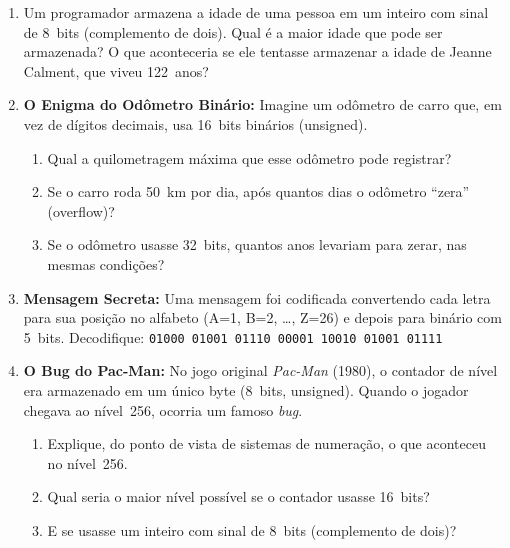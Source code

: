 \documentclass[11pt, a4paper]{article}
\begin{document}
\begin{enumerate}
\item Um programador armazena a idade de uma pessoa em um inteiro com sinal de 8~bits (complemento de dois). Qual \'{e} a maior idade que pode ser armazenada? O que aconteceria se ele tentasse armazenar a idade de Jeanne Calment, que viveu 122~anos?

\item \textbf{O Enigma do Od\^{o}metro Bin\'{a}rio:} Imagine um od\^{o}metro de carro que, em vez de d\'{i}gitos decimais, usa 16~bits bin\'{a}rios (unsigned).
\begin{enumerate}
  \item Qual a quilometragem m\'{a}xima que esse od\^{o}metro pode registrar?
  \item Se o carro roda 50~km por dia, ap\'{o}s quantos dias o od\^{o}metro ``zera'' (overflow)?
  \item Se o od\^{o}metro usasse 32~bits, quantos anos levariam para zerar, nas mesmas condi\c{c}\~{o}es?
\end{enumerate}

\item \textbf{Mensagem Secreta:} Uma mensagem foi codificada convertendo cada letra para sua posi\c{c}\~{a}o no alfabeto (A=1, B=2, \ldots, Z=26) e depois para bin\'{a}rio com 5~bits. Decodifique: \texttt{01000 01001 01110 00001 10010 01001 01111}

\item \textbf{O Bug do Pac-Man:} No jogo original \emph{Pac-Man} (1980), o contador de n\'{i}vel era armazenado em um \'{u}nico byte (8~bits, unsigned). Quando o jogador chegava ao n\'{i}vel~256, ocorria um famoso \emph{bug}.
\begin{enumerate}
  \item Explique, do ponto de vista de sistemas de numera\c{c}\~{a}o, o que aconteceu no n\'{i}vel~256.
  \item Qual seria o maior n\'{i}vel poss\'{i}vel se o contador usasse 16~bits?
  \item E se usasse um inteiro com sinal de 8~bits (complemento de dois)?
\end{enumerate}


\end{enumerate}
\end{document}
